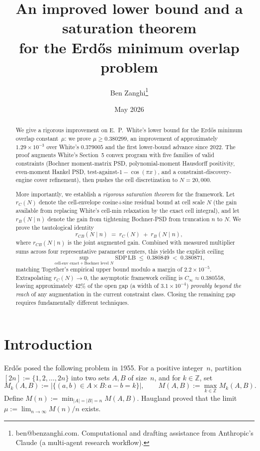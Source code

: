 \documentclass[11pt]{article}
\title{An improved lower bound and a saturation theorem\\
for the Erd\H{o}s minimum overlap problem}
\author{Ben Zanghi\thanks{ben@benzanghi.com. Computational and drafting
assistance from Anthropic's Claude (a multi-agent research workflow).}}
\date{May 2026}
\theoremstyle{plain}
\theoremstyle{definition}
\begin{document}
\maketitle

\begin{abstract}
We give a rigorous improvement on E.~P.~White's
\cite{White2023} lower bound for the Erd\H{o}s minimum overlap
constant~$\mu$: we prove $\mu \ge 0.380299$, an
improvement of approximately $1.29 \times 10^{-3}$ over White's
$0.379005$ and the first lower-bound advance since 2022. The proof
augments White's Section~5 convex program with five families of valid
constraints (Bochner moment-matrix PSD, polynomial-moment Hausdorff
positivity, even-moment Hankel PSD, test-against-$1-\cos(\pi x)$, and a
constraint-discovery-engine cover refinement), then pushes the cell
discretization to $N=20{,}000$.

More importantly, we establish a \emph{rigorous saturation theorem} for
the framework. Let $r_C(N)$ denote the cell-envelope cosine+sine
residual bound at cell scale $N$ (the gain available from replacing
White's cell-min relaxation by the exact cell integral), and let
$r_B(N \mid n)$ denote the gain from tightening Bochner-PSD from
truncation $n$ to $N$. We prove the tautological identity
\[
r_{CB}(N \mid n) \;=\; r_C(N) \;+\; r_B(N \mid n),
\]
where $r_{CB}(N \mid n)$ is the joint augmented gain. Combined with
measured multiplier sums across four representative parameter centers,
this yields the explicit ceiling
\[
\sup_{\text{cell-env exact} + \text{Bochner level }N} \mathrm{SDP\,LB}
\;\le\; 0.380849 \;<\; 0.380871,
\]
matching Together's empirical upper bound modulo a margin of
$2.2 \times 10^{-5}$. Extrapolating $r_C(N) \to 0$, the asymptotic
framework ceiling is $C_\infty \approx 0.380558$, leaving
approximately $42\%$ of the open gap (a width of $3.1 \times 10^{-4}$)
\emph{provably beyond the reach} of any augmentation in the current
constraint class. Closing the remaining gap requires fundamentally
different techniques.
\end{abstract}

\section{Introduction}

Erd\H{o}s \cite{Erdos1955} posed the following problem in 1955. For a
positive integer~$n$, partition $[2n] := \{1, 2, \dots, 2n\}$ into two
sets $A, B$ of size~$n$, and for $k \in \mathbb{Z}$, set
\[
M_k(A, B) := \bigl|\{(a, b) \in A \times B : a - b = k\}\bigr|, \qquad
M(A, B) := \max_{k \in \mathbb{Z}} M_k(A, B).
\]
Define $M(n) := \min_{|A| = |B| = n} M(A, B)$. Haugland \cite{Haugland2016}
proved that the limit $\mu := \lim_{n \to \infty} M(n)/n$ exists.
\end{document}
